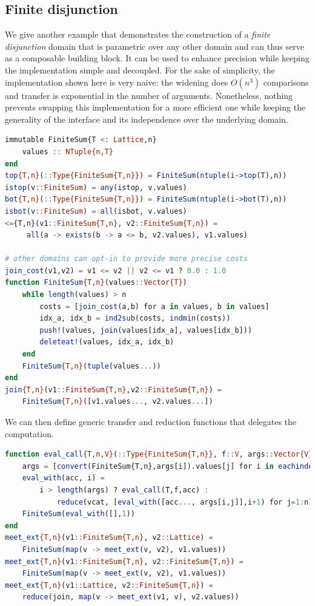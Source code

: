 \documentclass[11pt]{article}
\begin{document}
\subsection*{Finite disjunction}

We give another example that demonstrates the construction of a \emph{finite disjunction} domain that is parametric over any other domain and can thus serve as a composable building block. It can be used to enhance precision while keeping the implementation simple and decoupled. For the sake of simplicity, the implementation shown here is very naive: the widening does $O(n^3)$ comparisons and transfer is exponential in the number of arguments. Nonetheless, nothing prevents swapping this implementation for a more efficient one while keeping the generality of the interface and its independence over the underlying domain.

\begin{lstlisting}[language=julia]
immutable FiniteSum{T <: Lattice,n}
    values :: NTuple{n,T}
end
top{T,n}(::Type{FiniteSum{T,n}}) = FiniteSum(ntuple(i->top(T),n))
istop(v::FiniteSum) = any(istop, v.values)
bot{T,n}(::Type{FiniteSum{T,n}}) = FiniteSum(ntuple(i->bot(T),n))
isbot(v::FiniteSum) = all(isbot, v.values)
<={T,n}(v1::FiniteSum{T,n}, v2::FiniteSum{T,n}) =
     all(a -> exists(b -> a <= b, v2.values), v1.values)

# other domains can opt-in to provide more precise costs
join_cost(v1,v2) = v1 <= v2 || v2 <= v1 ? 0.0 : 1.0
function FiniteSum{T,n}(values::Vector{T})
    while length(values) > n
        costs = [join_cost(a,b) for a in values, b in values]
        idx_a, idx_b = ind2sub(costs, indmin(costs))
        push!(values, join(values[idx_a], values[idx_b]))
        deleteat!(values, idx_a, idx_b)
    end
    FiniteSum{T,n}(tuple(values...))
end
join{T,n}(v1::FiniteSum{T,n},v2::FiniteSum{T,n}) =
    FiniteSum{T,n}([v1.values..., v2.values...])
\end{lstlisting}

We can then define generic transfer and reduction functions that delegates the computation.

\begin{lstlisting}[language=julia]
function eval_call{T,n,V}(::Type{FiniteSum{T,n}}, f::V, args::Vector{V})
    args = [convert(FiniteSum{T,n},args[i]).values[j] for i in eachindex(args), j=1:n]
    eval_with(acc, i) =
        i > length(args) ? eval_call(T,f,acc) :
            reduce(vcat, [eval_with([acc..., args[i,j]],i+1) for j=1:n])
    FiniteSum(eval_with([],1))
end
meet_ext{T,n}(v1::FiniteSum{T,n}, v2::Lattice) =
    FiniteSum(map(v -> meet_ext(v, v2), v1.values))
meet_ext{T,n}(v1::FiniteSum{T,n}, v2::FiniteSum{T,n}) =
    FiniteSum(map(v -> meet_ext(v, v2), v1.values))
meet_ext{T,n}(v1::Lattice, v2::FiniteSum{T,n}) =
    reduce(join, map(v -> meet_ext(v1, v), v2.values))
\end{lstlisting}
\end{document}
